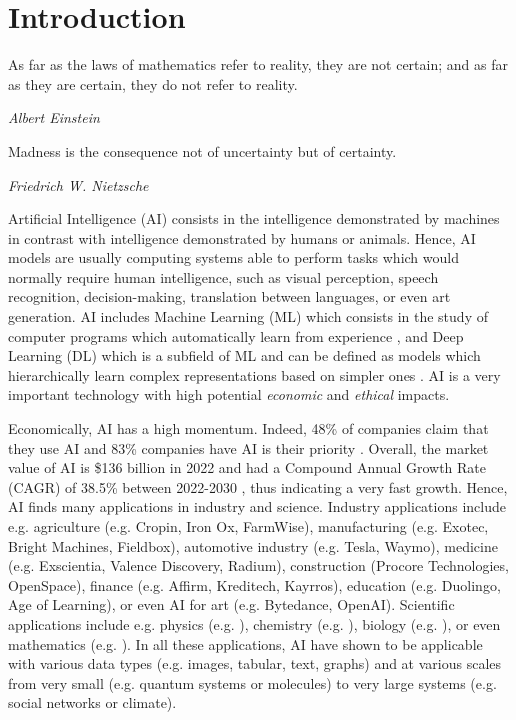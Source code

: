 \chapter{Introduction}
\label{chap:introduction}

\epigraph{As far as the laws of mathematics refer to reality, they are not certain; and as far as they are certain, they do not refer to reality.}{\textit{Albert Einstein}}

\epigraph{Madness is the consequence not of uncertainty but of certainty.}{\textit{Friedrich W. Nietzsche}}

Artificial Intelligence (AI) consists in the intelligence demonstrated by machines in contrast with intelligence demonstrated by humans or animals. 
Hence, AI models are usually computing systems able to perform tasks which would normally require human intelligence, such as visual perception, speech recognition, decision-making, translation between languages, or even art generation.
AI includes Machine Learning (ML) which consists in the study of computer programs which automatically learn from experience \citep{Mitchell97}, and Deep Learning (DL) which is a subfield of ML and can be defined as models which hierarchically learn complex representations based on simpler ones \citep{GoodBengCour16}.
AI is a very important technology with high potential \emph{economic} and \emph{ethical} impacts. 

Economically, AI has a high momentum. Indeed, 48\% of companies claim that they use AI \cite{ai-market-oreilly} and 83\% companies have AI is their priority \cite{ai-market-forbes}. Overall, the market value of AI is \$136 billion in 2022 \cite{ai-market} and had a Compound Annual Growth Rate (CAGR) of 38.5\% between 2022-2030 \cite{ai-market}, thus indicating a very fast growth.
Hence, AI finds many applications in industry and science. 
Industry applications include e.g. agriculture (e.g. Cropin, Iron Ox, FarmWise), manufacturing (e.g. Exotec, Bright Machines, Fieldbox), automotive industry (e.g. Tesla, Waymo), medicine (e.g. Exscientia, Valence Discovery, Radium), construction (Procore Technologies, OpenSpace), finance (e.g. Affirm, Kreditech, Kayrros), education (e.g. Duolingo, Age of Learning), or even AI for art (e.g. Bytedance, OpenAI).
Scientific applications include e.g. physics (e.g. \cite{gao2022abinitio}), chemistry (e.g. \cite{huang2021abinitio}), biology (e.g. \cite{hetzel2022predicting}), or even mathematics (e.g. \cite{cobbe2021math}).
In all these applications, AI have shown to be applicable with various data types (e.g. images, tabular, text, graphs) and at various scales from very small (e.g. quantum systems or molecules) to very large systems (e.g. social networks or climate).

